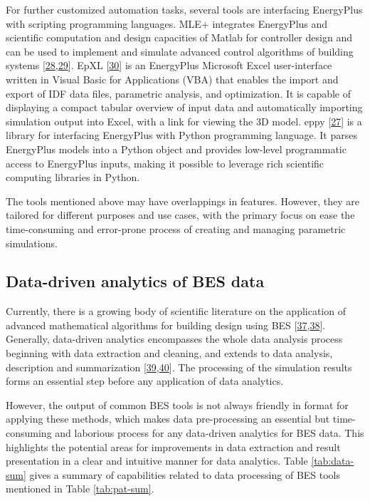 \documentclass[3p, times]{elsarticle} %
\begin{document}
For further customized automation tasks, several tools are interfacing
EnergyPlus with scripting programming languages. MLE+ integrates EnergyPlus and
scientific computation and design capacities of Matlab for controller design and
can be used to implement and simulate advanced control algorithms of building
systems {[}\protect\hyperlink{ref-Bernal2012}{28},\protect\hyperlink{ref-Zhao2013b}{29}{]}. EpXL {[}\protect\hyperlink{ref-Schild2020}{30}{]} is an EnergyPlus Microsoft
Excel user-interface written in Visual Basic for Applications (VBA) that enables
the import and export of IDF data files, parametric analysis, and optimization.
It is capable of displaying a compact tabular overview of input data and
automatically importing simulation output into Excel, with a link for viewing
the 3D model. eppy {[}\protect\hyperlink{ref-Philip2020}{27}{]} is a library for interfacing EnergyPlus with
Python programming language. It parses EnergyPlus models into a Python object
and provides low-level programmatic access to EnergyPlus inputs, making it
possible to leverage rich scientific computing libraries in Python.

The tools mentioned above may have overlappings in features. However, they are
tailored for different purposes and use cases, with the primary focus on ease
the time-consuming and error-prone process of creating and managing parametric
simulations.

\hypertarget{data-driven-analytics-of-bes-data}{%
\subsection{Data-driven analytics of BES data}\label{data-driven-analytics-of-bes-data}}

Currently, there is a growing body of scientific literature on the application
of advanced mathematical algorithms for building design using BES {[}\protect\hyperlink{ref-Kiss2020}{37},\protect\hyperlink{ref-Wei2018review}{38}{]}. Generally, data-driven analytics encompasses the whole data
analysis process beginning with data extraction and cleaning, and extends to
data analysis, description and summarization {[}\protect\hyperlink{ref-Molina-Solana2017}{39},\protect\hyperlink{ref-BurakGunay2019}{40}{]}. The processing of the simulation results forms an essential
step before any application of data analytics.

However, the output of common BES tools is not always friendly in format for
applying these methods, which makes data pre-processing an essential but
time-consuming and laborious process for any data-driven analytics for BES data.
This highlights the potential areas for improvements in data extraction and
result presentation in a clear and intuitive manner for data analytics. Table
\ref{tab:data-sum} gives a summary of capabilities related to data processing
of BES tools mentioned in Table \ref{tab:pat-sum}.
\end{document}
